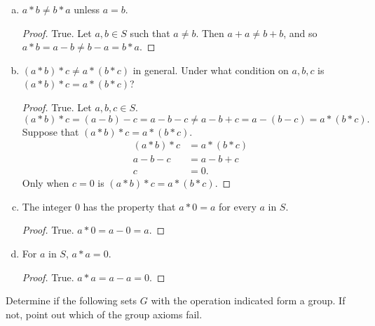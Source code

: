 \documentclass[addpoints, 11pt]{exam}
\newenvironment{question}[1]{\smallskip\noindent\color{crimson}{\bf Question #1.}}{}
\begin{document}
\begin{enumerate}[(a)]
    \color{crimson}
    \item  $a * b \neq b * a$ unless $a = b$.
    \normalcolor
    
    \begin{proof}
        True. Let $a, b \in S$ such that $a \neq b$. Then $a + a \neq b + b$, and so $a * b = a - b \neq b - a = b * a$.
    \end{proof}

    \color{crimson}
    \item  $(a * b) * c \neq a * (b * c)$ in general. Under what condition on $a, b, c$ is $(a * b) * c = a * (b * c)$?
    \normalcolor
    
    \begin{proof}
        True. Let $a, b, c \in S$.
        \[
            (a * b) * c = (a - b) - c = a - b - c \neq a - b + c = a - (b - c) = a * (b * c).
        \]
        Suppose that $(a * b) * c = a * (b * c)$. 
        \begin{align*}
            (a * b) * c &= a * (b * c) \\
            a - b - c &= a - b + c \\
            c &= 0.
        \end{align*}
        Only when $c = 0$ is $(a * b) * c = a * (b * c)$.
    \end{proof}

    \color{crimson}
    \item  The integer $0$ has the property that $a * 0 = a$ for every $a$ in $S$.
    \normalcolor
    
    \begin{proof}
        True. $a * 0 = a - 0 = a$.
    \end{proof}

    \color{crimson}
    \item  For $a$ in $S$, $a * a = 0$.
    \normalcolor
    
    \begin{proof}
        True. $a * a = a - a = 0$.
    \end{proof}
\end{enumerate}

\newpage

\begin{question}{2.1.1}
    Determine if the following sets $G$ with the operation indicated form a group. If not, point out which of the group axioms fail.
\end{question}
\end{document}
